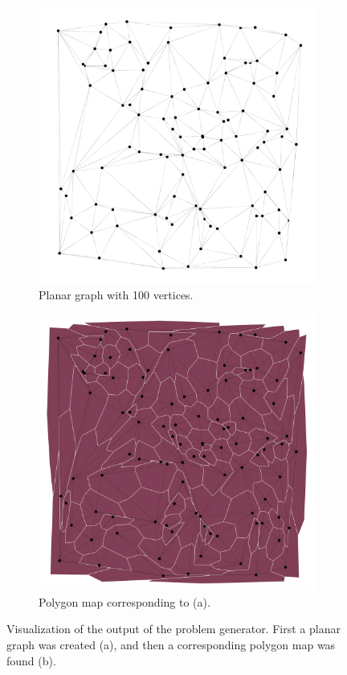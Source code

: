 \documentclass{article}
\begin{document}
		\begin{figure}[h!]
			\centering
			\begin{subfigure}{0.45\textwidth}
				\centering
				\includegraphics[width=\textwidth]{images/pgen}
				\caption{Planar graph with 100 vertices.}
				\label{pgen}
			\end{subfigure}
			\qquad
			\begin{subfigure}{0.45\textwidth}
				\centering
					\includegraphics[width=\textwidth]{images/pgen_poly}
					\caption{Polygon map corresponding to (a).}
					\label{pgen_poly}
			\end{subfigure}
			\caption{Visualization of the output of the problem generator. First a planar graph was created (a), and then a corresponding polygon map was found (b).}
		\end{figure}
		
\end{document}
